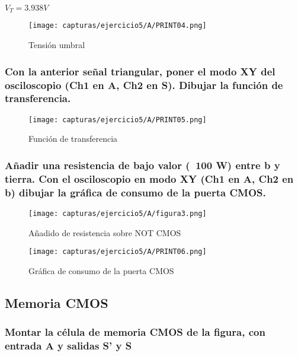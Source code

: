 $ V_{T} = 3.938 V $

\begin{figure}[H] %
	\centering
	\texttt{[image: capturas/ejercicio5/A/PRINT04.png]} 
	\caption{Tensión umbral}
	\label{fig:practica5-a-8}
\end{figure}

\newpage

\subsubsection{Con la anterior señal triangular, poner el modo XY del osciloscopio (Ch1 en
	A, Ch2 en S). Dibujar la función de transferencia.}

\begin{figure}[H] %
	\centering
	\texttt{[image: capturas/ejercicio5/A/PRINT05.png]} 
	\caption{Función de transferencia}
	\label{fig:practica5-a-9}
\end{figure}

\subsubsection{Añadir una resistencia de bajo
	valor (~100 W) entre b y tierra. Con el osciloscopio en modo XY (Ch1 en A, Ch2
	en b) dibujar la gráfica de consumo de la puerta CMOS.}

\begin{figure}[H] %
	\centering
	\texttt{[image: capturas/ejercicio5/A/figura3.png]} 
	\caption{Añadido de resistencia sobre NOT CMOS}
	\label{fig:practica5-a-10}
\end{figure}

\begin{figure}[H] %
	\centering
	\texttt{[image: capturas/ejercicio5/A/PRINT06.png]} 
	\caption{Gráfica de consumo de la puerta CMOS}
	\label{fig:practica5-a-11}
\end{figure}

\subsection{Memoria CMOS}

\subsubsection{Montar la célula de memoria CMOS de la figura, con entrada A y salidas S’ y S}

